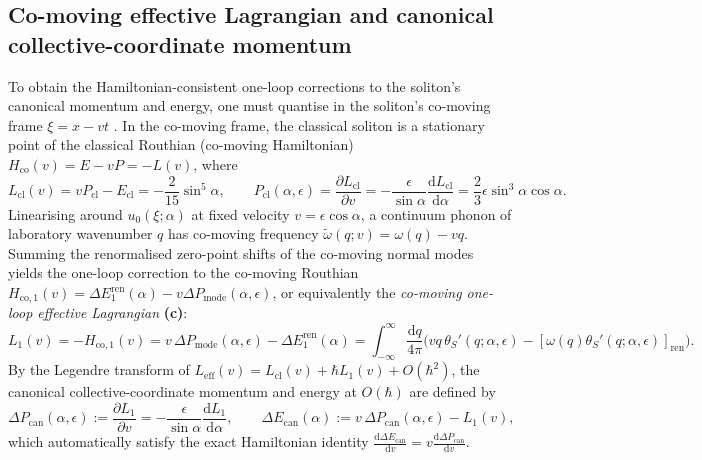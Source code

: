 \documentclass[11pt,a4paper]{article}
\newcommand{\dd}{\mathrm{d}}
\newcommand{\hb}{\hbar}
\begin{document}
\subsection{Co-moving effective Lagrangian and canonical collective-coordinate momentum}

To obtain the Hamiltonian-consistent one-loop corrections to the soliton's
canonical momentum and energy, one must quantise in the soliton's co-moving frame
$\xi = x - vt$ \cite{FK1978,DHN1974}. In the co-moving frame, the classical
soliton is a stationary point of the classical Routhian (co-moving Hamiltonian)
$H_{\mathrm{co}}(v) = E - vP = -L(v)$, where
\begin{equation}
  L_{\mathrm{cl}}(v) = vP_{\mathrm{cl}} - E_{\mathrm{cl}} = -\frac{2}{15}\sin^5\alpha, \qquad
  P_{\mathrm{cl}}(\alpha,\epsilon) = \frac{\partial L_{\mathrm{cl}}}{\partial v}
  = -\frac{\epsilon}{\sin\alpha}\frac{\dd L_{\mathrm{cl}}}{\dd\alpha}
  = \frac{2}{3}\epsilon\sin^3\alpha\cos\alpha.
\end{equation}
Linearising around $u_0(\xi;\alpha)$ at fixed velocity $v = \epsilon\cos\alpha$,
a continuum phonon of laboratory wavenumber $q$ has co-moving frequency
$\tilde{\omega}(q;v) = \omega(q) - vq$. Summing the renormalised zero-point shifts
of the co-moving normal modes yields the one-loop correction to the co-moving
Routhian $H_{\mathrm{co},1}(v) = \Delta E_1^{\mathrm{ren}}(\alpha) - v\Delta P_{\mathrm{mode}}(\alpha,\epsilon)$,
or equivalently the \emph{co-moving one-loop effective Lagrangian} \textbf{(c)}:
\begin{equation}
  L_1(v) = -H_{\mathrm{co},1}(v)
  = v\,\Delta P_{\mathrm{mode}}(\alpha,\epsilon) - \Delta E_1^{\mathrm{ren}}(\alpha)
  = \int_{-\infty}^\infty \frac{\dd q}{4\pi}\Big(v q\,\theta_S'(q;\alpha,\epsilon) - [\omega(q)\theta_S'(q;\alpha,\epsilon)]_{\mathrm{ren}}\Big).
  \label{eq:L1_comoving}
\end{equation}
By the Legendre transform of $L_{\mathrm{eff}}(v) = L_{\mathrm{cl}}(v) + \hb L_1(v) + O(\hb^2)$,
the canonical collective-coordinate momentum and energy at $O(\hb)$ are defined by
\begin{equation}
  \Delta P_{\mathrm{can}}(\alpha,\epsilon) := \frac{\partial L_1}{\partial v}
  = -\frac{\epsilon}{\sin\alpha}\frac{\dd L_1}{\dd\alpha}, \qquad
  \Delta E_{\mathrm{can}}(\alpha) := v\,\Delta P_{\mathrm{can}}(\alpha,\epsilon) - L_1(v),
  \label{eq:Legendre_1loop}
\end{equation}
which automatically satisfy the exact Hamiltonian identity
$\frac{\dd\Delta E_{\mathrm{can}}}{\dd v} = v\frac{\dd\Delta P_{\mathrm{can}}}{\dd v}$.
\end{document}
